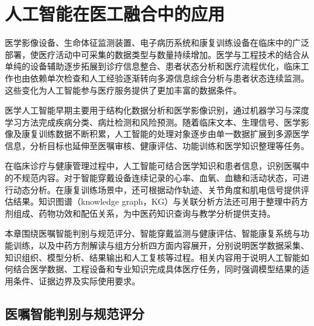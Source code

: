 
\setcounter{chapter}{9}
\chapter{人工智能在医工融合中的应用}

医学影像设备、生命体征监测装置、电子病历系统和康复训练设备在临床中的广泛部署，使医疗活动中可采集的数据类型与数量持续增加。医学与工程技术的结合从单纯的设备辅助逐步拓展到诊疗信息整合、患者状态分析和医疗流程优化，临床工作也由依赖单次检查和人工经验逐渐转向多源信息综合分析与患者状态连续监测。这些变化为人工智能参与医疗服务提供了更加丰富的数据条件。

医学人工智能早期主要用于结构化数据分析和医学影像识别，通过机器学习与深度学习方法完成疾病分类、病灶检测和风险预测。随着临床文本、生理信号、医学影像及康复训练数据不断积累，人工智能的处理对象逐步由单一数据扩展到多源医学信息，分析目标也延伸至医嘱审核、健康评估、功能训练和医学知识整理等任务。

在临床诊疗与健康管理过程中，人工智能可结合医学知识和患者信息，识别医嘱中的不规范内容。对于智能穿戴设备连续记录的心率、血氧、血糖和活动状态，可进行动态分析。在康复训练场景中，还可根据动作轨迹、关节角度和肌电信号提供评估结果。知识图谱（knowledge graph，KG）与关联分析方法还可用于整理中药方剂组成、药物功效和配伍关系，为中医药知识查询与教学分析提供支持。

本章围绕医嘱智能判别与规范评分、智能穿戴监测与健康评估、智能康复系统与功能训练，以及中药方剂解读与组方分析四方面内容展开，分别说明医学数据采集、知识组织、模型分析、结果输出和人工复核等过程。相关内容用于说明人工智能如何结合医学数据、工程设备和专业知识完成具体医疗任务，同时强调模型结果的适用条件、证据边界及实际使用要求。


\clearpage
\section{医嘱智能判别与规范评分}

